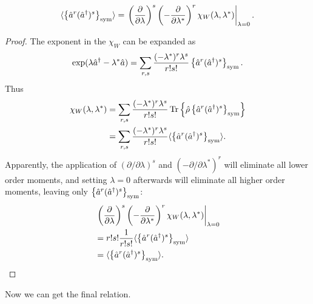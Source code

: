\begin{lemma}
	\label{lmm:sm-wigner:moments-from-chi}
	\[
		\langle \left\{  \hat{a}^r (\hat{a}^\dagger)^s  \right\}_{\mathrm{sym}} \rangle
		= \left.
			\left( \frac{\partial}{\partial \lambda} \right)^s
			\left( -\frac{\partial}{\partial \lambda^*} \right)^r
			\chi_W (\lambda, \lambda^*)
		\right|_{\lambda=0}.
	\]
\end{lemma}
\begin{proof}
The exponent in the $\chi_W$ can be expanded as
\begin{equation}
	\exp (\lambda \hat{a}^\dagger - \lambda^* \hat{a}) \\
	= \sum_{r,s}
		\frac{(-\lambda^*)^r \lambda^s}{r!s!}
		\left\{  \hat{a}^r (\hat{a}^\dagger)^s  \right\}_{\mathrm{sym}}.
\end{equation}
Thus
\begin{equation}
\begin{split}
	\chi_W(\lambda, \lambda^*)
	& = \sum_{r,s}
		\frac{(-\lambda^*)^r \lambda^s}{r!s!}
		\operatorname{Tr} \left\{ 
			\hat{\rho} \left\{  \hat{a}^r (\hat{a}^\dagger)^s  \right\}_{\mathrm{sym}}
		 \right\} \\
	& = \sum_{r,s}
		\frac{(-\lambda^*)^r \lambda^s}{r!s!}
		\langle \left\{  \hat{a}^r (\hat{a}^\dagger)^s  \right\}_{\mathrm{sym}} \rangle.
\end{split}
\end{equation}
Apparently, the application of $(\partial / \partial \lambda)^s$ and $(-\partial / \partial \lambda^*)^r$ will eliminate all lower order moments, and setting $\lambda = 0$ afterwards will eliminate all higher order moments, leaving only $\left\{  \hat{a}^r (\hat{a}^\dagger)^s  \right\}_{\mathrm{sym}}$:
\begin{equation}
\begin{split}
	& \left.
		\left( \frac{\partial}{\partial \lambda} \right)^s
		\left( -\frac{\partial}{\partial \lambda^*} \right)^r
		\chi_W (\lambda, \lambda^*)
	\right|_{\lambda=0} \\
	& = r! s! \frac{1}{r! s!}
		\langle \left\{  \hat{a}^r (\hat{a}^\dagger)^s  \right\}_{\mathrm{sym}} \rangle \\
	& = \langle \left\{  \hat{a}^r (\hat{a}^\dagger)^s  \right\}_{\mathrm{sym}} \rangle.
	\qedhere
\end{split}
\end{equation}
\end{proof}

Now we can get the final relation.

